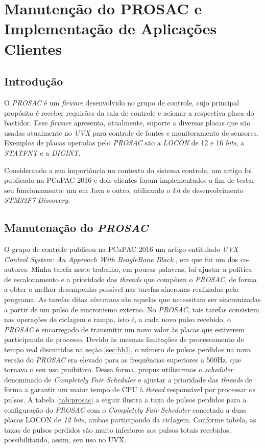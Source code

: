 \section {Manutenção do PROSAC e Implementação de Aplicações Clientes}

\subsection{Introdução}

O \textit{PROSAC} é um \textit{firware} desenvolvido no grupo de controle, cujo
principal propósito é receber requisões da sala de controle e acionar a
respectiva placa do bastidor. Esse \textit{firware} apresenta, atualmente,
suporte a diversas placas que são usadas atualmente no \textit{UVX} para
controle de fontes e monitoramento de sensores. Exemplos de placas operadas pelo
\textit{PROSAC} são a \textit{LOCON} de 12 e 16 \textit{bits}, a
\textit{STATFNT} e a \textit{DIGINT}.

\vspace{12px}

Considerando a sua importância no contexto do sistema controle, um artigo
foi publicado na PCaPAC 2016 e dois clientes foram implementados a fim de testar
seu funcionamento: um em Java e outro, utilizando o \textit{kit} de
desenvolvimento \textit{STM32F7 Discovery}.

\subsection {Manutenação do \textit{PROSAC}}

O grupo de controle publicou na PCaPAC 2016 um artigo entitulado \textit{UVX
Control System: An Approach With BeagleBone Black} \cite{pcapac2016}, em que fui
um dos co-autores. Minha tarefa neste trabalho, em poucas palavras, foi ajustar
a política de escalonamento e a prioridade das \textit{threads} que compõem o
\textit{PROSAC}, de forma a obter o melhor desempenho possível nas tarefas
síncronas realizadas pelo programa. As tarefas ditas \textit{síncronas}
são aquelas que necessitam ser sincronizadas a partir de um pulso de sincronismo
externo. No \textit{PROSAC}, tais tarefas consistem nas operações de ciclagem e
rampa, isto é, a cada novo pulso recebido, o \textit{PROSAC} é encarregado de
transmitir um novo valor às placas que estiverem participando do processo.
Devido às mesmas limitações de processamento de tempo real discuitidas na seção
\ref{sec:bb1}, o número de pulsos perdidos na nova versão do \textit{PROSAC} era
elevado para as frequências superiores a 500Hz, que tornava o seu uso
proibitivo. Dessa forma, propus utilizarmos o \textit{scheduler} denominado de
\textit{Completely Fair Scheduler} e ajustar a prioridade das \textit{threads}
de forma a garantir um maior tempo de CPU à \textit{thread} responsável por
processar os pulsos. A tabela \ref{tab:prosac} a seguir ilustra a taxa de pulsos
perdidos para a configuração do \textit{PROSAC} com o \textit{Completely Fair
Scheduler} conectado a duas placas LOCON de \textit{12 bits}, ambas
participando da ciclagem. Conforme tabela, as taxas de pulsos perdidos são muito
inferiores aos pulsos totais recebidos, possibilitando, assim, seu uso no UVX.

